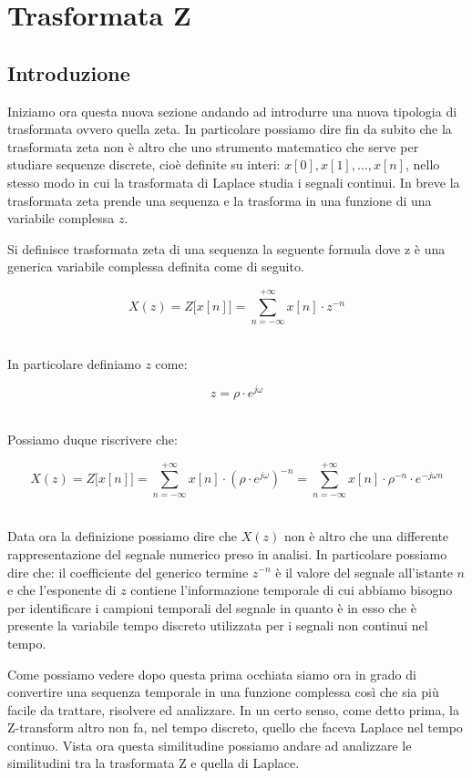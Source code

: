 \documentclass[../main.tex]{subfiles}
\begin{document}
\clearpage
\thispagestyle{empty}
\vspace*{7cm}
\section{Trasformata Z}
\vspace*{1.5cm}

\subsection{Introduzione}

Iniziamo ora questa nuova sezione andando ad introdurre una nuova tipologia di trasformata ovvero quella zeta. In particolare possiamo dire fin da subito che la trasformata zeta non è altro che uno strumento matematico che serve per studiare sequenze discrete, cioè definite su interi: $x[0], x[1], \dots , x[n]$,  nello stesso modo in cui la trasformata di Laplace studia i segnali continui. 
In breve la  trasformata zeta prende una sequenza e la trasforma in una funzione di una variabile complessa $z$.

\begin{definition*}
Si definisce trasformata zeta di una sequenza la seguente formula dove z è una generica variabile complessa definita come di seguito.
\end{definition*}

\[ X(z) = Z\big[x[n]\big] = \sum_{n = -\infty}^{+\infty} x[n] \cdot z^{-n}  \]\

In particolare definiamo $z$ come:

\[ z = \rho \cdot e^{j\omega} \]\

Possiamo duque riscrivere che:

\[ X(z) = Z\big[x[n]\big] = \sum_{n = -\infty}^{+\infty} x[n] \cdot (\rho \cdot e^{j\omega})^{-n} = \sum_{n = -\infty}^{+\infty} x[n] \cdot \rho^{-n} \cdot e^{-j\omega n}\]\

Data ora la definizione possiamo dire che $X(z)$ non è altro che una differente rappresentazione del segnale numerico preso in analisi.
In particolare possiamo dire che: il coefficiente del generico termine $z^{-n}$ è il valore del segnale all’istante $n$ e che l’esponente di $z$ contiene l’informazione temporale di cui abbiamo bisogno per identificare i campioni temporali del segnale in quanto è in esso che è presente la variabile tempo discreto utilizzata per i segnali non continui nel tempo.

Come possiamo vedere dopo questa prima occhiata siamo ora in grado di convertire una sequenza temporale in una funzione complessa così che sia più facile da trattare, risolvere ed analizzare. In un certo senso, come detto prima, la Z-transform altro non fa, nel tempo discreto, quello che faceva Laplace nel tempo continuo.
Vista ora questa similitudine possiamo andare ad analizzare le similitudini tra la trasformata Z e quella di Laplace.
\end{document}

